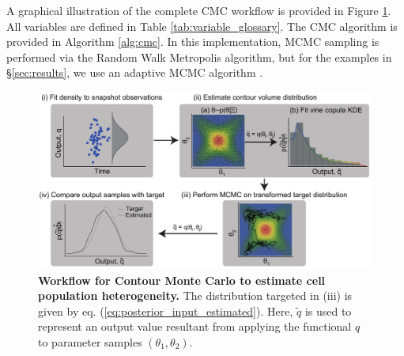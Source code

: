 A graphical illustration of the complete CMC workflow is provided in Figure \ref{fig:workflow}. All variables are defined in Table \ref{tab:variable_glossary}. The CMC algorithm is provided in Algorithm \ref{alg:cmc}. In this implementation, MCMC sampling is performed via the Random Walk Metropolis algorithm, but for the examples in \S \ref{sec:results}, we use an adaptive MCMC algorithm \cite{johnstone2016uncertainty}.

\begin{figure}[H]
  \centerline{\includegraphics[width=1.5\textwidth]{../figures/workflow.pdf}}
  \caption{\textbf{Workflow for Contour Monte Carlo to estimate cell population heterogeneity.} The distribution targeted in (iii) is given by eq. (\ref{eq:posterior_input_estimated}). Here, $\tilde q$ is used to represent an output value resultant from applying the functional $q$ to parameter samples $(\theta_1,\theta_2)$.}
  \label{fig:workflow}
\end{figure}

